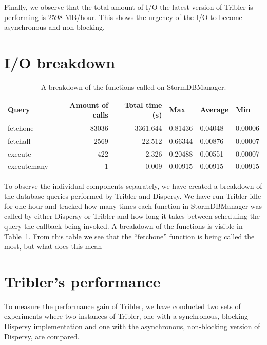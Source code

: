 Finally, we observe that the total amount of I/O the latest version of Tribler is performing is 2598 MB/hour.
This shows the urgency of the I/O to become asynchronous and non-blocking.

\section{I/O breakdown}

\begin{table}[]
	\centering
	\caption{A breakdown of the functions called on StormDBManager.}
	\label{table:breakdown_tribler_idle}
	\begin{tabular}{|l|r|r|l|l|l|}
		\hline
		\textbf{Query}	& \textbf{Amount of calls} & \textbf{Total time (s)} & \textbf{Max}  & \textbf{Average} & \textbf{Min} \\ \hline
		fetchone	& 83036	& 3361.644 	& 0.81436	& 0.04048	& 0.00006 \\ \hline
		fetchall	& 2569	& 22.512	& 0.66344	& 0.00876	& 0.00007 \\ \hline
		execute		& 422	& 2.326  	& 0.20488	& 0.00551	& 0.00007 \\ \hline
		executemany	& 1		& 0.009 	& 0.00915 	& 0.00915	& 0.00915 \\ \hline
	\end{tabular}
\end{table}

To observe the individual components separately, we have created a breakdown of the database queries performed by Tribler and Dispersy.
We have run Tribler idle for one hour and tracked how many times each function in StormDBManager was called by either Dispersy or Tribler and how long it takes between scheduling the query the callback being invoked.
A breakdown of the functions is visible in Table~\ref{table:breakdown_tribler_idle}.
From this table we see that the \enquote{fetchone} function is being called the most, but what does this mean

\section{Tribler's performance}

To measure the performance gain of Tribler, we have conducted two sets of experiments where two instances of Tribler, one with a synchronous, blocking Dispersy implementation and one with the asynchronous, non-blocking version of Dispersy, are compared.


